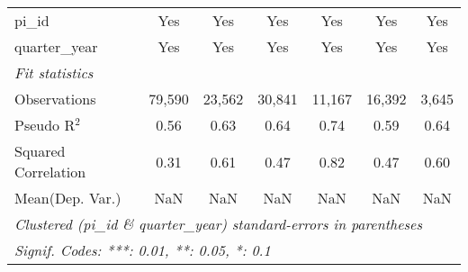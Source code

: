 \begin{tabular}{lcccccc}
   pi\_id                                                     & Yes           & Yes           & Yes           & Yes           & Yes           & Yes\\  
   quarter\_year                                              & Yes           & Yes           & Yes           & Yes           & Yes           & Yes\\  
   \midrule
   \emph{Fit statistics}\\
   Observations                                               & 79,590        & 23,562        & 30,841        & 11,167        & 16,392        & 3,645\\  
   Pseudo R$^2$                                               & 0.56          & 0.63          & 0.64          & 0.74          & 0.59          & 0.64\\  
   Squared Correlation                                        & 0.31          & 0.61          & 0.47          & 0.82          & 0.47          & 0.60\\  
Mean(Dep. Var.) & NaN & NaN & NaN & NaN & NaN & NaN \\
   \midrule \midrule
   \multicolumn{7}{l}{\emph{Clustered (pi\_id \& quarter\_year) standard-errors in parentheses}}\\
   \multicolumn{7}{l}{\emph{Signif. Codes: ***: 0.01, **: 0.05, *: 0.1}}\\
\end{tabular}
\par\endgroup
